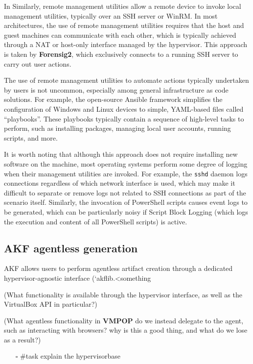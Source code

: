 \documentclass[letterpaper,12pt]{report}
\def\tightlist{}
\newcommand{\passthrough}[1]{#1}
\begin{document}
In Similarly, remote management utilities allow a remote device to
invoke local management utilities, typically over an SSH server or
WinRM. In most architectures, the use of remote management utilities
requires that the host and guest machines can communicate with each
other, which is typically achieved through a NAT or host-only interface
managed by the hypervisor. This approach is taken by \textbf{Forensig2},
which exclusively connects to a running SSH server to carry out user
actions.

The use of remote management utilities to automate actions typically
undertaken by users is not uncommon, especially among general
infrastructure as code solutions. For example, the open-source Ansible
framework simplifies the configuration of Windows and Linux devices to
simple, YAML-based files called ``playbooks''. These playbooks typically
contain a sequence of high-level tasks to perform, such as installing
packages, managing local user accounts, running scripts, and more.

It is worth noting that although this approach does not require
installing new software on the machine, most operating systems perform
some degree of logging when their management utilities are invoked. For
example, the \passthrough{\lstinline!sshd!} daemon logs connections
regardless of which network interface is used, which may make it
difficult to separate or remove logs not related to SSH connections as
part of the scenario itself. Similarly, the invocation of PowerShell
scripts causes event logs to be generated, which can be particularly
noisy if Script Block Logging (which logs the execution and content of
all PowerShell scripts) is active.

\subsection{AKF agentless
generation}\label{akf-agentless-generation}

AKF allows users to perform agentless artifact creation through a
dedicated hypervisor-agnostic interface (`akflib.\textless something

(What functionality is available through the hypervisor interface, as
well as the VirtualBox API in particular?)

(What agentless functionality in \textbf{VMPOP} do we instead delegate
to the agent, such as interacting with browsers? why is this a good
thing, and what do we lose as a result?)

\begin{itemize}
\tightlist
\item[$\square$]
  \#task explain the hypervisorbase
\end{itemize}
\end{document}
